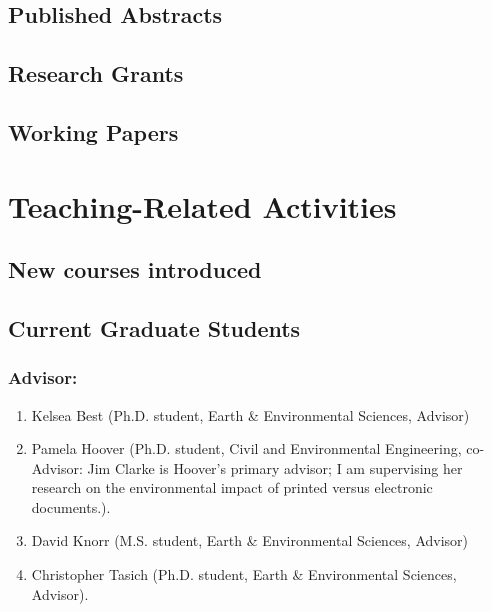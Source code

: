 \documentclass[10pt]{article}
\begin{document}
    \subsection{Published Abstracts}
    \begin{enumerate}
    
    
    \end{enumerate}
    \subsection{Research Grants}
    
\iffalse
    \subsection{Creative Expression}
    
\fi
%
\iftrue
    \subsection{Working Papers} %
    
\fi


\iffalse
\section{Teaching-Related Activities}
    \subsection{New courses introduced}
    
    \subsection{Current Graduate Students}
    \subsubsection{Advisor:}
    \begin{enumerate}
    \item Kelsea Best (Ph.D. student, Earth \& Environmental Sciences, Advisor)
    \item Pamela Hoover (Ph.D. student, Civil and Environmental Engineering, co-Advisor: Jim Clarke is Hoover's primary advisor; I am supervising her research on the environmental impact of printed versus electronic documents.).
    \item David Knorr (M.S. student, Earth \& Environmental Sciences, Advisor)
    \item Christopher Tasich (Ph.D. student, Earth \& Environmental Sciences, Advisor).
    \end{enumerate}
\end{document}
